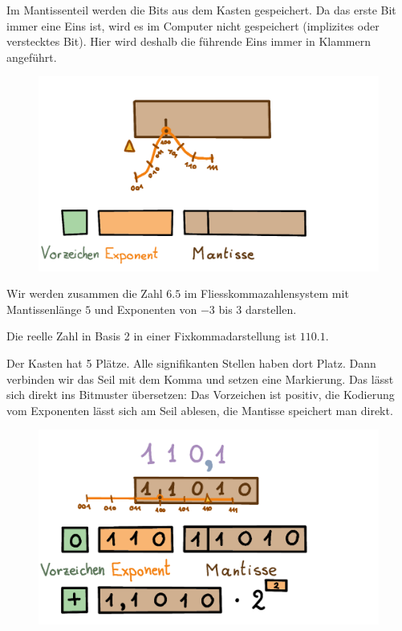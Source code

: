 Im Mantissenteil werden die Bits aus dem Kasten gespeichert. Da das erste Bit immer eine Eins ist, wird es im Computer nicht gespeichert (implizites oder verstecktes Bit). Hier wird deshalb die führende Eins immer in Klammern angeführt.
\begin{figure}[H]
\centering
\includegraphics[width=0.75\linewidth]{Pictures/KastenMitSpeicher.png} 
\end{figure}

\begin{beispiel}
Wir werden zusammen die Zahl \(6.5\) im Fliesskommazahlensystem mit Mantissenlänge \(5\) und Exponenten von \(-3\) bis \(3\) darstellen.

Die reelle Zahl in Basis 2 in einer Fixkommadarstellung ist \(110.1\).

Der Kasten hat 5 Plätze. Alle signifikanten Stellen haben dort Platz. Dann verbinden wir das Seil mit dem Komma und setzen eine Markierung. Das lässt sich direkt ins Bitmuster übersetzen: Das Vorzeichen ist positiv, die Kodierung vom Exponenten lässt sich am Seil ablesen, die Mantisse speichert man direkt.
\begin{figure}[H]
\centering
\includegraphics[width=0.75\linewidth]{Pictures/ZahlenDarstellen6-5.png} 
\end{figure}

\end{beispiel}

